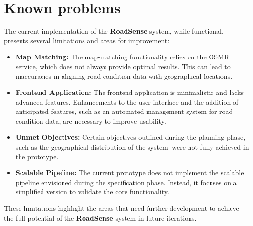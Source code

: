 \section{Known problems}

The current implementation of the \textbf{RoadSense} system, while functional, presents several limitations and areas for improvement:

\begin{itemize}
    \item \textbf{Map Matching:} The map-matching functionality relies on the OSMR service, which does not always provide optimal results. This can lead to inaccuracies in aligning road condition data with geographical locations.
    \item \textbf{Frontend Application:} The frontend application is minimalistic and lacks advanced features. Enhancements to the user interface and the addition of anticipated features, such as an automated management system for road condition data, are necessary to improve usability.
    \item \textbf{Unmet Objectives:} Certain objectives outlined during the planning phase, such as the geographical distribution of the system, were not fully achieved in the prototype.
    \item \textbf{Scalable Pipeline:} The current prototype does not implement the scalable pipeline envisioned during the specification phase. Instead, it focuses on a simplified version to validate the core functionality.
\end{itemize}

\noindent These limitations highlight the areas that need further development to achieve the full potential of the \textbf{RoadSense} system in future iterations.
